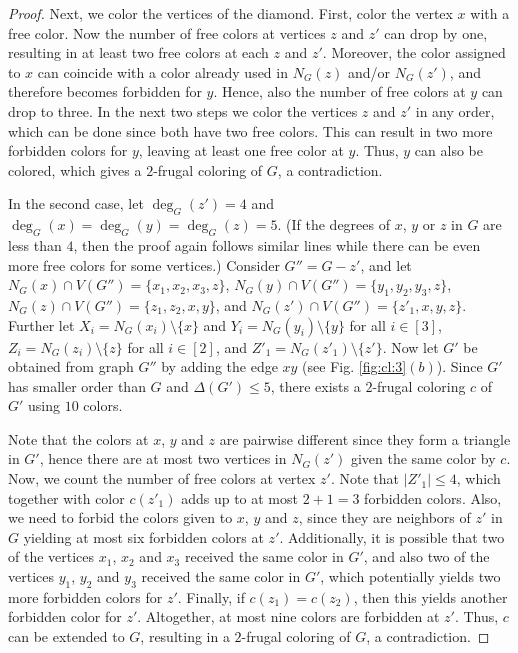 \documentclass[11pt]{article}
\begin{document}
\begin{proof}
Next, we color the vertices of the diamond. First, color the vertex $x$ with a free color. Now the number of free colors at vertices $z$ and $z'$ can drop by one, resulting in at least two free colors at each $z$ and $z'$. Moreover, the color assigned to $x$ can coincide with a color already used in $N_G(z)$ and/or $N_G(z')$, and therefore becomes forbidden for $y$. Hence, also the number of free colors at $y$ can drop to three. In the next two steps we color the vertices $z$ and $z'$ in any order, which can be done since both have two free colors. This can result in two more forbidden colors for $y$, leaving at least one free color at $y$. Thus, $y$ can also be colored, which gives a $2$-frugal coloring of $G$, a contradiction.

\medskip

In the second case, let $\deg_G(z')=4$ and $\deg_G(x)=\deg_G(y)=\deg_G(z)=5$. (If the degrees of $x$, $y$ or $z$ in $G$ are less than $4$, then the proof again follows similar lines while there can be even more free colors for some vertices.) Consider $G''=G-z'$, and let $N_G(x) \cap V(G'')=\{x_1,x_2,x_3,z\}$, $N_G(y) \cap V(G'')=\{y_1,y_2,y_3,z\}$, $N_G(z) \cap V(G'')=\{z_1,z_2,x,y\}$, and $N_G(z') \cap V(G'')=\{z'_1,x,y,z\}$. Further let $X_i=N_G(x_i)\setminus \{x\}$ and $Y_i=N_G(y_i)\setminus \{y\}$ for all $i\in[3]$, $Z_i=N_G(z_i)\setminus \{z\}$ for all $i \in [2]$, and $Z'_1=N_G(z'_1)\setminus \{z'\}$. Now let $G'$ be obtained from graph $G''$ by adding the edge  $xy$ (see Fig. \ref{fig:cl:3}$(b)$). 
Since $G'$ has smaller order than $G$ and $\Delta(G')\le 5$, there exists a $2$-frugal coloring $c$ of $G'$ using $10$ colors.

Note that the colors at $x$, $y$ and $z$ are pairwise different since they form a triangle in $G'$, hence there are at most two vertices in $N_G(z')$ given the same color by $c$. 
Now, we count the number of free colors at vertex $z'$.
Note that $|Z'_1| \le 4$, which together with color $c(z'_1)$ adds up to at most $2+1=3$ forbidden colors. Also, we need to forbid the colors given to $x$, $y$ and $z$, since they are neighbors of $z'$ in $G$ yielding at most six forbidden colors at $z'$. Additionally, it is possible that two of the vertices $x_1$, $x_2$ and $x_3$ received the same color in $G'$, and also two of the vertices $y_1$, $y_2$ and $y_3$ received the same color in $G'$, which potentially yields two more forbidden colors for $z'$. Finally, if $c(z_1)=c(z_2)$, then this yields another forbidden color for $z'$. Altogether, at most nine colors are forbidden at $z'$. Thus, $c$ can be extended to $G$, resulting in a $2$-frugal coloring of $G$, a contradiction.  
\end{proof}
\end{document}
